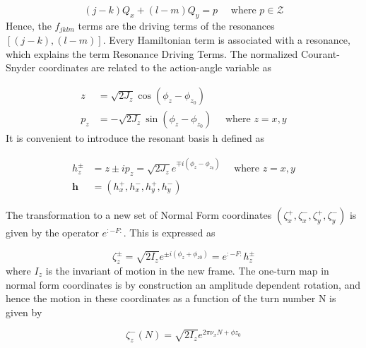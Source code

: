 \begin{equation}
    (j-k) Q_{x} + (l-m) Q_{y} = p \quad \text{ where } p \in \mathcal{Z}
    \label{eq:resonance_condition}
\end{equation}
Hence, the \(f_{jklm}\) terms are the driving terms of the resonances \([(j-k),(l-m)]\).
Every Hamiltonian term is associated with a resonance, which explains the term Resonance Driving Terms.
The normalized Courant-Snyder coordinates are related to the action-angle variable as

\begin{equation}
    \begin{aligned}
    z &= \sqrt{2 J_{z}} \cos (\phi_{z} - \phi_{z_{0}}) \\
    p_{z} &= -\sqrt{2 J_{z}} \sin (\phi_{z} - \phi_{z_{0}}) \quad \text { where } z=x, y
    \end{aligned}
    \label{eq:courant_snyder_to_action_angle}
\end{equation}
It is convenient to introduce the resonant basis h defined as

\begin{equation}
    \begin{aligned}
    h_{z}^{\pm} &= z \pm i p_{z} = \sqrt{2 J_{z}} e^{\mp i \left(\phi_{z}-\phi_{z_{0}}\right)} \quad \text { where } z=x, y \\
    \mathbf{h} &= \left( h_{x}^{+}, h_{x}^{-}, h_{y}^{+}, h_{y}^{-} \right)
    \end{aligned}
    \label{eq:resonant_basis_h}
\end{equation}

The transformation to a new set of Normal Form coordinates \(\left(\zeta_{x}^{+}, \zeta_{x}^{-}, \zeta_{y}^{+}, \zeta_{y}^{-}\right)\) is given by the operator \(e^{: -F :}\).
This is expressed as

\begin{equation}
    \zeta_{z}^{\pm} = \sqrt{2 I_{z}} e^{\pm i \left(\phi_{z}+\phi_{z 0} \right)} = e^{:-F:} h_{z}^{\pm}
    \label{eq:action_angle_to_normal_form}
\end{equation}
where \(I_{z}\) is the invariant of motion in the new frame.
The one-turn map in normal form coordinates is by construction an amplitude dependent rotation, and hence the motion in these coordinates as a function of the turn number N is given by

\begin{equation}
    \zeta_{z}^{-}(N) = \sqrt{2 I_{z}} e^{2 \pi \nu_{x} N + \phi z_{0}}
    \label{eq:normal_form_by_turn}
\end{equation}

